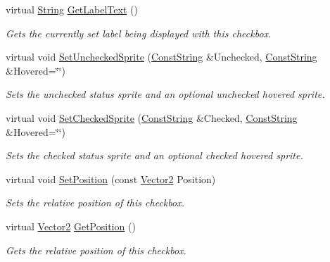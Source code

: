 \begin{DoxyCompactItemize}
virtual \hyperlink{namespacephys_aa03900411993de7fbfec4789bc1d392e}{String} \hyperlink{classphys_1_1UI_1_1CheckBox_a19078efa52e8b2c133f3b5229b8742eb}{GetLabelText} ()
\begin{DoxyCompactList}\small\item\em Gets the currently set label being displayed with this checkbox. \item\end{DoxyCompactList}\item 
virtual void \hyperlink{classphys_1_1UI_1_1CheckBox_ab4b6304f4203a244dea48185eff81f43}{SetUncheckedSprite} (\hyperlink{namespacephys_a5ce5049f8b4bf88d6413c47b504ebb31}{ConstString} \&Unchecked, \hyperlink{namespacephys_a5ce5049f8b4bf88d6413c47b504ebb31}{ConstString} \&Hovered=\char`\"{}\char`\"{})
\begin{DoxyCompactList}\small\item\em Sets the unchecked status sprite and an optional unchecked hovered sprite. \item\end{DoxyCompactList}\item 
virtual void \hyperlink{classphys_1_1UI_1_1CheckBox_a283705ddaab86875a3a025d34f53bec1}{SetCheckedSprite} (\hyperlink{namespacephys_a5ce5049f8b4bf88d6413c47b504ebb31}{ConstString} \&Checked, \hyperlink{namespacephys_a5ce5049f8b4bf88d6413c47b504ebb31}{ConstString} \&Hovered=\char`\"{}\char`\"{})
\begin{DoxyCompactList}\small\item\em Sets the checked status sprite and an optional checked hovered sprite. \item\end{DoxyCompactList}\item 
virtual void \hyperlink{classphys_1_1UI_1_1CheckBox_ac71d4b2b748ff00c723e36b35dfce3ec}{SetPosition} (const \hyperlink{classphys_1_1Vector2}{Vector2} Position)
\begin{DoxyCompactList}\small\item\em Sets the relative position of this checkbox. \item\end{DoxyCompactList}\item 
virtual \hyperlink{classphys_1_1Vector2}{Vector2} \hyperlink{classphys_1_1UI_1_1CheckBox_a8a8630b27ab769b6e42657c5388ec7fe}{GetPosition} ()
\begin{DoxyCompactList}\small\item\em Gets the relative position of this checkbox. \item\end{DoxyCompactList}\item 

\end{DoxyCompactItemize}
